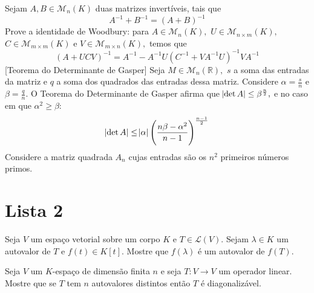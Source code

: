 \documentclass[11pt,a4paper]{article}
\begin{document}
 Sejam $A, B \in \mathcal{M}_n(K)$ duas matrizes invertíveis, tais que
\[
A^{-1} + B^{-1} = (A + B)^{-1}
\]
    \solucao{}
     Prove a identidade de Woodbury: para $A \in \mathcal{M}_n(K),$ $U \in \mathcal{M}_{n \times m}(K),$ $C \in \mathcal{M}_{m \times m}(K)$ e $V \in \mathcal{M}_{m \times n}(K),$ temos que
    \[\left(A + UCV \right)^{-1} = A^{-1} - A^{-1}U \left(C^{-1} + VA^{-1}U \right)^{-1} VA^{-1}
    \]
    \solucao{}
     [Teorema do Determinante de Gasper] 
    Seja $M \in \mathcal{M}_n(\mathbb{R}),$ $s$ a soma das entradas da matriz e $q$ a soma dos quadrados das entradas dessa matriz. Considere $\alpha = \frac{s}{n}$ e $\beta = \frac{q}{n}.$ O Teorema do Determinante de Gasper afirma que $\abs{\det A} \le \beta^{\frac{n}{2}},$ e no caso em que $\alpha^2 \ge \beta:$
    \[
    \abs{\det A} \le \abs{\alpha} \left(  \frac{n \beta - \alpha^2 }{n-1} \right)^{\frac{n-1}{2}}
    \]
        \solucao{}
     Considere a matriz quadrada $A_n$ cujas entradas são os $n^2$ primeiros números primos. 
    
\newpage
\section{\textcolor{Floresta}{Lista 2}}


 Seja $V$ um espaço vetorial sobre um corpo $K$ e $T \in \mathcal{L}(V).$ Sejam $\lambda \in K$ um autovalor de $T$ e $f(t) \in K[t].$ Mostre que $f(\lambda)$ é um autovalor de $f(T).$

 \solucao{}
 
  Seja $V$ um $K$-espaço de dimensão finita $n$ e seja $T \colon V \to V$ um operador linear. Mostre que se $T$ tem $n$ autovalores distintos então $T$ é diagonalizável.
  \solucao{}
 
\end{document}
